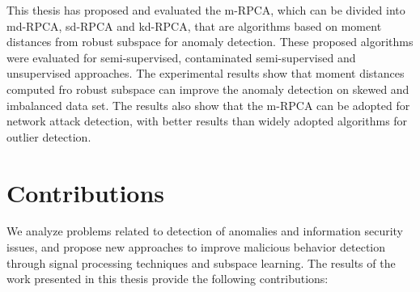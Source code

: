 This thesis has proposed and evaluated the m-RPCA, which can be divided into md-RPCA, sd-RPCA and kd-RPCA, that are algorithms based on moment distances from robust subspace for anomaly detection. These proposed algorithms were evaluated for semi-supervised, contaminated semi-supervised and unsupervised approaches. The experimental results show that moment distances computed fro robust subspace can improve the anomaly detection on skewed and imbalanced data set. The results also show that the m-RPCA can be adopted for network attack detection, with better results than widely adopted algorithms for outlier detection.

\section{Contributions}
\label{sc:conc_contributions}

We analyze problems related to detection of anomalies and information security issues, and propose new approaches to improve malicious behavior detection through signal processing techniques and subspace learning. The results of the work presented in this thesis provide the following contributions:


